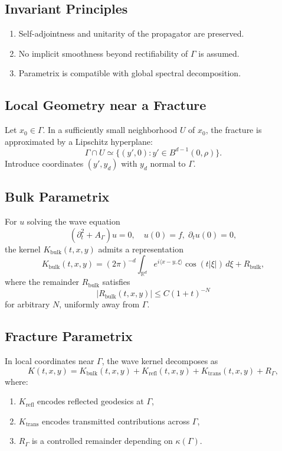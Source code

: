 \subsection*{Invariant Principles}
\begin{enumerate}[label=I\arabic*]
  \item Self-adjointness and unitarity of the propagator are preserved.
  \item No implicit smoothness beyond rectifiability of $\Gamma$ is assumed.
  \item Parametrix is compatible with global spectral decomposition.
\end{enumerate}

\subsection*{Local Geometry near a Fracture}
Let $x_0 \in \Gamma$. In a sufficiently small neighborhood $U$ of $x_0$, the
fracture is approximated by a Lipschitz hyperplane:
\[
\Gamma \cap U \simeq \{(y',0) : y' \in B^{d-1}(0,\rho)\}.
\]
Introduce coordinates $(y',y_d)$ with $y_d$ normal to $\Gamma$.

\subsection*{Bulk Parametrix}
\begin{theorem}
\label{thm:bulk-parametrix}
For $u$ solving the wave equation
\[
(\partial_t^2 + A_\Gamma)u = 0, \quad u(0)=f, \; \partial_t u(0)=0,
\]
the kernel $K_{\mathrm{bulk}}(t,x,y)$ admits a representation
\[
K_{\mathrm{bulk}}(t,x,y) = (2\pi)^{-d} \int_{\mathbb{R}^d}
e^{i\langle x-y,\xi\rangle} \cos(t|\xi|)\, d\xi + R_{\mathrm{bulk}},
\]
where the remainder $R_{\mathrm{bulk}}$ satisfies
\[
|R_{\mathrm{bulk}}(t,x,y)| \leq C (1+t)^{-N}
\]
for arbitrary $N$, uniformly away from $\Gamma$.
\end{theorem}

\subsection*{Fracture Parametrix}
\begin{theorem}
\label{thm:fracture-parametrix}
In local coordinates near $\Gamma$, the wave kernel decomposes as
\[
K(t,x,y) = K_{\mathrm{bulk}}(t,x,y) +
K_{\mathrm{refl}}(t,x,y) + K_{\mathrm{trans}}(t,x,y) + R_\Gamma,
\]
where:
\begin{enumerate}
  \item $K_{\mathrm{refl}}$ encodes reflected geodesics at $\Gamma$,
  \item $K_{\mathrm{trans}}$ encodes transmitted contributions across $\Gamma$,
  \item $R_\Gamma$ is a controlled remainder depending on $\kappa(\Gamma)$.
\end{enumerate}
\end{theorem}

